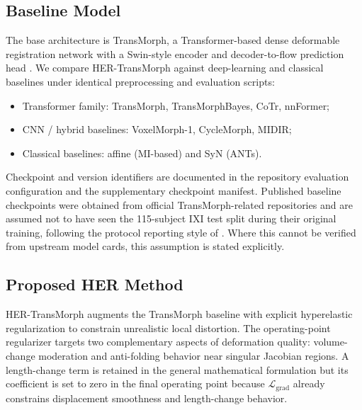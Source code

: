 \documentclass[jimaging,article,submit,pdftex,moreauthors]{Definitions/mdpi}
\begin{document}
\subsection{Baseline Model}
The base architecture is TransMorph, a Transformer-based dense deformable registration network with a Swin-style encoder and decoder-to-flow prediction head \citep{chen2022transmorph,liu2021swin}. We compare HER-TransMorph against deep-learning and classical baselines under identical preprocessing and evaluation scripts:
\begin{itemize}
\item Transformer family: TransMorph, TransMorphBayes, CoTr, nnFormer;
\item CNN / hybrid baselines: VoxelMorph-1, CycleMorph, MIDIR;
\item Classical baselines: affine (MI-based) and SyN (ANTs).
\end{itemize}
Checkpoint and version identifiers are documented in the repository evaluation configuration and the supplementary checkpoint manifest.
Published baseline checkpoints were obtained from official TransMorph-related repositories and are assumed not to have seen the 115-subject IXI test split during their original training, following the protocol reporting style of \citet{chen2022transmorph}. Where this cannot be verified from upstream model cards, this assumption is stated explicitly.

\subsection{Proposed HER Method}
HER-TransMorph augments the TransMorph baseline with explicit hyperelastic regularization to constrain unrealistic local distortion. The operating-point regularizer targets two complementary aspects of deformation quality: volume-change moderation and anti-folding behavior near singular Jacobian regions. A length-change term is retained in the general mathematical formulation but its coefficient is set to zero in the final operating point because \(\mathcal{L}_{\mathrm{grad}}\) already constrains displacement smoothness and length-change behavior.
\end{document}
